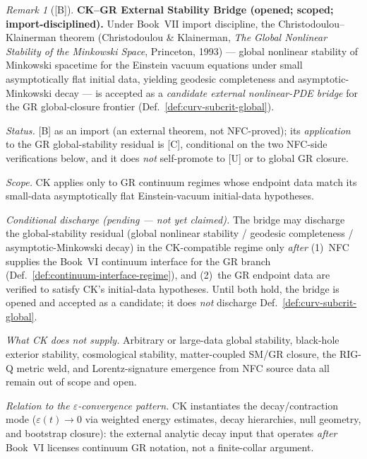 \documentclass[12pt,oneside]{amsbook}
\theoremstyle{plain}
\theoremstyle{definition}
\theoremstyle{remark}
\newtheorem{remark}[theorem]{Remark}
\newcommand{\status}[1]{\textup{[#1]}}
\begin{document}
\begin{remark}[\status{B}]\label{rmk:ck-gr-stability-bridge}
\textbf{CK--GR External Stability Bridge (opened; scoped; import-disciplined).}
Under Book~VII import discipline, the Christodoulou--Klainerman theorem
(Christodoulou \& Klainerman, \emph{The Global Nonlinear Stability of the
Minkowski Space}, Princeton, 1993) --- global nonlinear stability of
Minkowski spacetime for the Einstein vacuum equations under small
asymptotically flat initial data, yielding geodesic completeness and
asymptotic-Minkowski decay --- is accepted as a \emph{candidate external
nonlinear-PDE bridge} for the GR global-closure frontier
(Def.~\ref{def:curv-subcrit-global}).

\emph{Status.} \status{B} as an import (an external theorem, not
NFC-proved); its \emph{application} to the GR global-stability residual
is \status{C}, conditional on the two NFC-side verifications below, and
it does \emph{not} self-promote to \status{U} or to global GR closure.

\emph{Scope.} CK applies only to GR continuum regimes whose endpoint data
match its small-data asymptotically flat Einstein-vacuum initial-data
hypotheses.

\emph{Conditional discharge (pending --- not yet claimed).} The bridge
may discharge the global-stability residual (global nonlinear stability /
geodesic completeness / asymptotic-Minkowski decay) in the CK-compatible
regime only \emph{after} (1)~NFC supplies the Book~VI continuum interface
for the GR branch (Def.~\ref{def:continuum-interface-regime}), and
(2)~the GR endpoint data are verified to satisfy CK's initial-data
hypotheses. Until both hold, the bridge is opened and accepted as a
candidate; it does \emph{not} discharge Def.~\ref{def:curv-subcrit-global}.

\emph{What CK does not supply.} Arbitrary or large-data global stability,
black-hole exterior stability, cosmological stability, matter-coupled
SM/GR closure, the RIG-Q metric weld, and Lorentz-signature emergence
from NFC source data all remain out of scope and open.

\emph{Relation to the $\varepsilon$-convergence pattern.} CK instantiates
the decay/contraction mode ($\varepsilon(t)\to 0$ via weighted energy
estimates, decay hierarchies, null geometry, and bootstrap closure): the
external analytic decay input that operates \emph{after} Book~VI licenses
continuum GR notation, not a finite-collar argument.


\end{remark}
\end{document}

